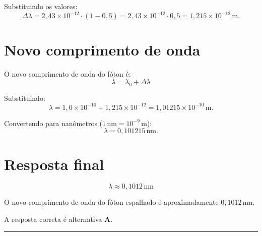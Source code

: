 \documentclass[a4paper,12pt]{article}
\begin{document}
\begin{flushleft}
Substituindo os valores:
\[
\Delta \lambda =
2{,}43 \times 10^{-12} \cdot (1 - 0{,}5) =
2{,}43 \times 10^{-12} \cdot 0{,}5 =
1{,}215 \times 10^{-12}\,\mathrm{m}.
\]

\section*{Novo comprimento de onda}

O novo comprimento de onda do fóton é:
\[
\lambda = \lambda_0 + \Delta\lambda
\]

Substituindo:
\[
\lambda =
1{,}0 \times 10^{-10} + 1{,}215 \times 10^{-12} =
1{,}01215 \times 10^{-10}\,\mathrm{m}.
\]

Convertendo para nanômetros (\(1\,\mathrm{nm} = 10^{-9}\,\mathrm{m}\)):
\[
\lambda =
0{,}101215\,\mathrm{nm}.
\]

\section*{Resposta final}

\[
\boxed{
\lambda \approx 0{,}1012\,\mathrm{nm}
}
\]

O novo comprimento de onda do fóton espalhado é aproximadamente \(0{,}1012\,\mathrm{nm}\).

A resposta correta é alternativa \colorbox{green!50}{\textbf{A}}.
\end{flushleft}

\noindent\rule{\linewidth}{0.6pt}\\
\end{document}
